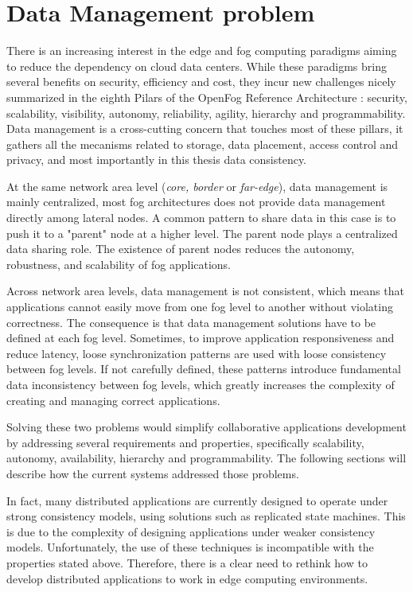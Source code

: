 \section{Data Management problem}
\label{sec:data-management-problem}
There is an increasing interest in the edge and fog computing paradigms 
aiming to reduce the dependency on cloud data centers.
While these paradigms bring several benefits on security, efficiency and 
cost, they incur new challenges nicely summarized in the eighth Pilars 
of the OpenFog Reference Architecture \cite{byers2017openfog}:
security, scalability, visibility, autonomy, reliability, agility, 
hierarchy and programmability.
Data management is a cross-cutting concern that touches most of these pillars,
it gathers all the mecanisms related to storage, data placement, access control
and privacy, and most importantly in this thesis data consistency.

At the same network area level (\textit{core, border} or \textit{far-edge}),
data management is mainly centralized,
most fog architectures does not provide data management directly among
lateral nodes.
A common pattern to share data in this case is to push it to a "parent" node
at a higher level.
The parent node plays a centralized data sharing role.
The existence of parent nodes reduces the autonomy, robustness,
and scalability of fog applications.

Across network area levels, data management is not consistent,
which means that applications cannot easily move from one fog level to another 
without violating correctness.
The consequence is that data management solutions have to be defined at 
each fog level.
Sometimes, to improve application responsiveness and reduce latency, 
loose synchronization patterns are used with loose consistency between fog levels.
If not carefully defined, 
these patterns introduce fundamental data inconsistency between fog levels, 
which greatly increases the complexity of creating and managing correct applications.

Solving these two problems would simplify collaborative applications 
development by addressing several requirements and properties,
specifically scalability, autonomy, availability, hierarchy and programmability.
The following sections will describe how the current systems addressed those
problems.

In fact, many distributed applications are currently designed to operate under strong consistency models, using solutions such as replicated state machines. This is due to the complexity of designing applications under weaker consistency models. Unfortunately, the use of these techniques is incompatible with the properties stated above. Therefore, there is a clear need to rethink how to develop distributed applications to work in edge computing environments.

